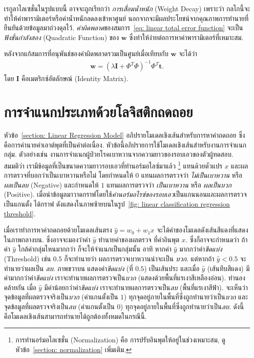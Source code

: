 เรกูลาไลเซชั่นในรูปแบบนี้ อาจจะถูกเรียกว่า \textit{การเสื่อมน้ำหนัก} (Weight Decay)
เพราะว่า กลไกนี้จะทำให้ค่าพารามิเตอร์หรือค่าน้ำหนักลดลงเข้าหาศูนย์ 
นอกจากจะมีผลประโยชน์จากคุณภาพการทำนายที่ยืนยันด้วยข้อมูลมาถ่วงดุลไว้.
\textit{ค่าผิดพลาด}ของสมการ~\ref{eq: linear total error function} จะเป็น\textit{ฟังชั่นกำลังสอง} (Quadratic Function) ของ $\mathbf{w}$ ซึ่งทำให้ง่ายต่อการหาค่าพารามิเตอร์ที่เหมาะสม.

หลังจากแก้สมการที่อนุพันธ์ของค่าผิดพลาดรวมเป็นศูนย์เมื่อเทียบกับ $\mathbf{w}$ จะได้ว่า
\begin{eqnarray}
   \mathbf{w} = (\lambda \mathbf{I} + \Phi^T \Phi)^{-1} \Phi^T \mathbf{t}.
\label{eq: linear w regularization}
\end{eqnarray}
โดย $\mathbf{I}$ คือเมตริกซ์อัตลักษณ์ (Identity Matrix).

\section{การจำแนกประเภทด้วยโลจิสติกถดถอย}
\label{section: Logistic Regression}

หัวข้อ~\ref{section: Linear Regression Model} อภิปรายโมเดลเชิงเส้นสำหรับการหาค่าถดถอย 
ซึ่งคือการคำนายค่าเอาต์พุตที่เป็นค่าต่อเนื่อง.
หัวข้อนี้อภิปรายการใช้โมเดลเชิงเส้นสำหรับงานการจำแนกกลุ่ม.
%
ตัวอย่างเช่น งานการจำแนกผู้ป่วยโรคเบาหวานจากความยาวของรอบเอวของตัวผู้ทดสอบ.
สมมติว่า เรามีข้อมูลที่เป็นขนาดความยาวรอบเอวที่ทำนอร์มอไลซ์มาแล้ว%
\footnote{การทำนอร์มอไลเซชั่น (Normalization) คือ การปรับอินพุตให้อยู่ในช่วงเหมาะสม, ดูหัวข้อ~\ref{section: normalization} เพิ่มเติม.}
แทนด้วยตัวแปร $x$ 
และผลการตรวจที่บอกว่าเป็นเบาหวานหรือไม่
โดยกำหนดให้ $0$ แทนผลการตรวจว่า \textit{ไม่เป็นเบาหวาน} หรือ \textit{ผลเป็นลบ} (Negative) 
และกำหนดให้ $1$ แทนผลการตรวจว่า \textit{เป็นเบาหวาน} หรือ \textit{ผลเป็นบวก} (Positive).
เมื่อนำข้อมูลมาวาดกราฟโดยใช้\textit{ค่านอร์มอไรซ์ของรอบเอว}เป็นแกนนอนและผลการตรวจเป็นแกนตั้ง ได้กราฟ ดังแสดงในภาพซ้ายบนในรูป~\ref{fig: linear classification regression threshold}.

เมื่อเราทำการหาค่าถดถอยด้วยโมเดลเส้นตรง $\hat{y} = w_0 + w_1 x$ จะได้ค่าของโมเดลดังเส้นสีแดงที่แสดงในภาพกลางบน.
ซึ่งอาจจะมองว่าค่า $\hat{y}$ ทำนายค่าของผลตรวจ ที่ค่าอินพุต $x$. 
ซึ่งก็อาจจะกำหนดว่า ถ้าค่า $\hat{y}$ ใกล้ค่ากลุ่มไหนมากกว่า ก็จะให้จำแนกเป็นกลุ่มนั้น
อาทิ หากค่า $\hat{y}$ มากกว่าค่า\textit{ขีดแบ่ง} (Threshold) เช่น $0.5$ ก็จะทำนายว่า ผลการตรวจเบาหวานน่าจะเป็น \textit{บวก}. 
แต่หากถ้า $\hat{y} < 0.5$ จะทำนายว่าผลเป็น \textit{ลบ}.
ภาพขวาบน แสดงค่า\textit{ขีดแบ่ง} (ที่ $0.5$) เป็นเส้นประ 
และเมื่อ $\hat{y}$ (เส้นทึบสีแดง) มีค่ามากกว่าค่า\textit{ขีดแบ่ง} เราจะทำนายผลการตรวจเป็น\textit{บวก} (แสดงด้วยพื้นที่แรเงาสีเหลืองอ่อน).
ทำนองคล้ายกัน เมื่อ $\hat{y}$ มีค่าน้อยกว่าค่า\textit{ขีดแบ่ง} เราจะทำนายผลการตรวจเป็น\textit{ลบ}  (พื้นที่แรเงาสีฟ้า).
จะเห็นว่า จุดข้อมูลที่ผลตรวจจริงเป็น\textit{บวก} (ค่าแกนตั้งเป็น $1$) ทุกจุดอยู่ภายในพื้นที่ซึ่งถูกทำนายว่าเป็น\textit{บวก}
และจุดข้อมูลที่ผลตรวจจริงเป็น\textit{ลบ} (ค่าแกนตั้งเป็น $0$) 
ทุกจุดอยู่ภายในพื้นที่ซึ่งถูกทำนายว่าเป็น\textit{ลบ}.
ดังนี้ คือโมเดลเชิงเส้นสามารถทำนายได้ถูกต้องทั้งหมดในกรณีนี้.

